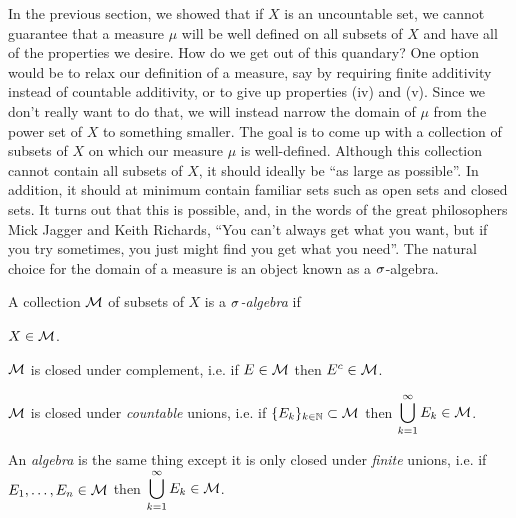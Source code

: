 \documentclass[main.tex]{subfiles}
\begin{document}
In the previous section, we showed that if $X$ is an uncountable set, we cannot guarantee that a measure $\mu$ will be well defined on all subsets of $X$ and have all of the properties we desire. How do we get out of this quandary? One option would be to relax our definition of a measure, say by requiring finite additivity instead of countable additivity, or to give up properties (iv) and (v). Since we don't really want to do that, we will instead narrow the domain of $\mu$ from the power set of $X$ to something smaller. The goal is to come up with a collection of subsets of $X$ on which our measure $\mu$ is well-defined. Although this collection cannot contain all subsets of $X$, it should ideally be ``as large as possible''. In addition, it should at minimum contain familiar sets such as open sets and closed sets. It turns out that this is possible, and, in the words of the great philosophers Mick Jagger and Keith Richards, ``You can't always get what you want, but if you try sometimes, you just might find you get what you need''. The natural choice for the domain of a measure is an object known as a ${\sigma}$-algebra.

\begin{definition}\label{def:salg}
A collection ${\mathcal M}$ of subsets of $X$ is a \emph{${\sigma}$-algebra} if 
\begin{romannum}
	\item $X \in {\mathcal M}$.
	\item ${\mathcal M}$ is closed under complement, i.e. if $E \in {\mathcal M}$ then $E^c \in {\mathcal M}$.
	\item ${\mathcal M}$ is closed under \emph{countable} unions, i.e. if $\{E_k\}_{k \in {\mathbb N}} \subset {\mathcal M}$ then $\begin{aligned}\bigcup_{k=1}^\infty E_k \in {\mathcal M} \end{aligned}$.
	
\end{romannum}
An \emph{algebra} is the same thing except it is only closed under \emph{finite} unions, i.e. if $E_1, \dots, E_n \in {\mathcal M}$ then $\begin{aligned}\bigcup_{k=1}^\infty E_k \in {\mathcal M} \end{aligned}$.
\end{definition}
\end{document}
